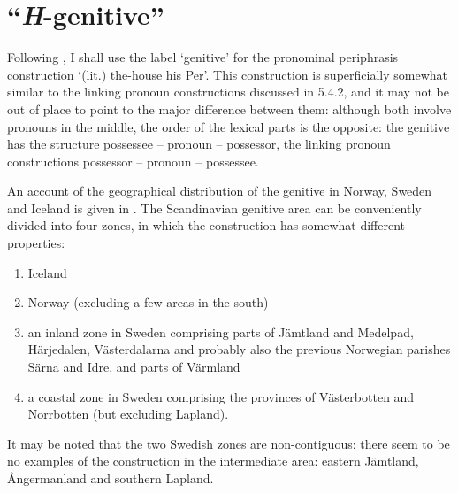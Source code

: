 
\section{“\textit{H}{}-genitive”}
\label{bkm:Ref154988643}
Following \citet{Delsing2003b}, I shall use the label ‘genitive’ for the pronominal periphrasis construction  ‘(lit.) the-house his Per’. This construction is superficially somewhat similar to the linking pronoun constructions discussed in 5.4.2, and it may not be out of place to point to the major difference between them: although both involve pronouns in the middle, the order of the lexical parts is the opposite: the genitive has the structure possessee – pronoun – possessor, the linking pronoun constructions possessor – pronoun – possessee.


An account of the geographical distribution of the genitive in Norway, Sweden and Iceland is given in \citet[34]{Delsing2003a}. The Scandinavian genitive area can be conveniently divided into four zones, in which the construction has somewhat different properties:


\begin{enumerate}
\item Iceland
\item Norway (excluding a few areas in the south) 
\item an inland zone in Sweden comprising parts of Jämtland and Medelpad, Härjedalen, Västerdalarna and probably also the previous Norwegian parishes Särna and Idre, and parts of Värmland
\item a coastal zone in Sweden comprising the provinces of Västerbotten and Norrbotten (but excluding Lapland).
\end{enumerate} 


It may be noted that the two Swedish zones are non-contiguous: there seem to be no examples of the construction in the intermediate area: eastern Jämtland, Ångermanland and southern Lapland. 


